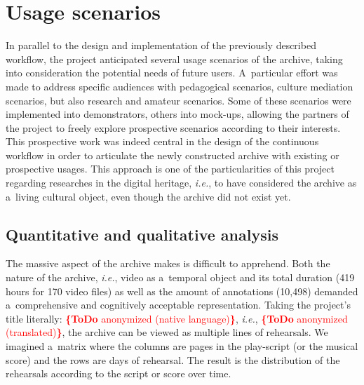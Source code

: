 \documentclass[conference]{IEEEtran}
\newcommand{\todo}[1]{\noindent\textcolor{red}{{\bf \{ToDo} #1{\bf \}}}}
\begin{document}
\section{Usage scenarios}
\label{sec:scenarios}
In parallel to the design and implementation of the previously described workflow, the project anticipated several usage scenarios of the archive, taking into consideration the potential needs of future users. A~particular effort was made to address specific audiences with pedagogical scenarios, culture mediation scenarios, but also research and amateur scenarios. Some of these scenarios were implemented into demonstrators, others into mock-ups, allowing the partners of the project to freely explore prospective scenarios according to their interests. This prospective work was indeed central in the design of the continuous workflow in order to articulate the newly constructed archive with existing or prospective usages. This approach is one of the particularities of this project regarding researches in the digital heritage, \emph{i.e.}, to have considered the archive as a~living cultural object, even though the archive did not exist yet.

\subsection{Quantitative and qualitative analysis}
The massive aspect of the archive makes is difficult to apprehend. Both the nature of the archive, \emph{i.e.}, video as a~temporal object\cite{stiegler98}  and its total duration (419 hours for 170 video files) as well as the amount of annotations (10,498) demanded a~comprehensive and cognitively acceptable representation. Taking the project's title literally:
\todo{anonymized (native language)}, \emph{i.e.},
\todo{anonymized (translated)},
the archive can be viewed as multiple lines of rehearsals. We imagined a~matrix where the columns are pages in the play-script  (or the musical score) and the rows are days of rehearsal. The result is the distribution of the rehearsals according to the script or score over time.

\end{document}
